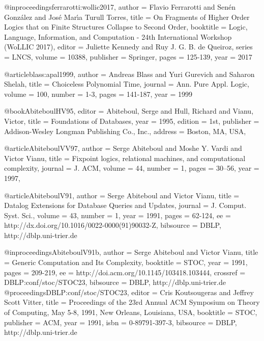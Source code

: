 \documentclass{article}
\begin{document}
@inproceedings{ferrarotti:wollic2017,
  author    = {Flavio Ferrarotti and
               Sen{\'{e}}n Gonz{\'{a}}lez and
               Jos{\'{e}} Mar\'{\i}a {Turull Torres}},
  title     = {On Fragments of Higher Order Logics that on Finite Structures Collapse
               to Second Order},
  booktitle = {Logic, Language, Information, and Computation - 24th International Workshop (WoLLIC 2017)},
  editor    = {Juliette Kennedy and Ruy J. G. B. {de Queiroz}},
  series    = {LNCS},
  volume    = {10388},
  publisher = {Springer},
  pages     = {125-139},
  year      = {2017}}

@article{blass:apal1999,
  author    = {Andreas Blass and
               Yuri Gurevich and
               Saharon Shelah},
  title     = {Choiceless Polynomial Time},
  journal   = {Ann. Pure Appl. Logic},
  volume    = {100},
  number    = {1-3},
  pages     = {141-187},
  year      = {1999}}









@book{AbiteboulHV95,
 editor = {Abiteboul, Serge and Hull, Richard and Vianu, Victor},
 title = {Foundations of Databases},
 year = {1995},
 edition = {1st},
 publisher = {Addison-Wesley Longman Publishing Co., Inc.},
 address = {Boston, MA, USA},
}

@article{AbiteboulVV97,
  author    = {Serge Abiteboul and
               Moshe Y. Vardi and
               Victor Vianu},
  title     = {Fixpoint logics, relational machines, and computational complexity},
  journal   = {J. {ACM}},
  volume    = {44},
  number    = {1},
  pages     = {30--56},
  year      = {1997},
}

@article{AbiteboulV91,
  author    = {Serge Abiteboul and
               Victor Vianu},
  title     = {Datalog Extensions for Database Queries and Updates},
  journal   = {J. Comput. Syst. Sci.},
  volume    = 43,
  number    = 1,
  year      = 1991,
  pages     = {62-124},
  ee        = {http://dx.doi.org/10.1016/0022-0000(91)90032-Z},
  bibsource = {DBLP, http://dblp.uni-trier.de}
}

@inproceedings{AbiteboulV91b,
  author    = {Serge Abiteboul and
               Victor Vianu},
  title     = {Generic Computation and Its Complexity},
  booktitle = {STOC},
  year      = {1991},
  pages     = {209-219},
  ee        = {http://doi.acm.org/10.1145/103418.103444},
  crossref  = {DBLP:conf/stoc/STOC23},
  bibsource = {DBLP, http://dblp.uni-trier.de}
}
@proceedings{DBLP:conf/stoc/STOC23,
  editor    = {Cris Koutsougeras and
               Jeffrey Scott Vitter},
  title     = {Proceedings of the 23rd Annual ACM Symposium on Theory of
               Computing, May 5-8, 1991, New Orleans, Louisiana, USA},
  booktitle = {STOC},
  publisher = {ACM},
  year      = {1991},
  isbn      = {0-89791-397-3},
  bibsource = {DBLP, http://dblp.uni-trier.de}
}
\end{document}
